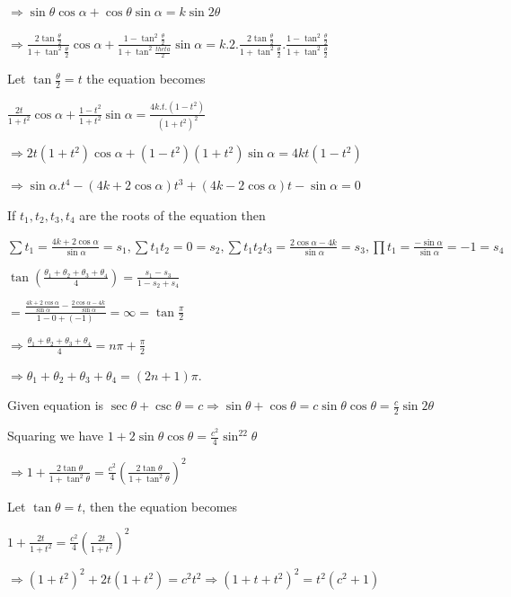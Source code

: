   $\Rightarrow \sin\theta\cos\alpha + \cos\theta\sin\alpha = k\sin2\theta$

  $\Rightarrow \frac{2\tan\frac{\theta}{2}}{1 + \tan^2\frac{\theta}{2}}\cos\alpha + \frac{1
  - \tan^2\frac{\theta}{2}}{1 + \tan^2\frac{theta}{2}}\sin\alpha = k.2.\frac{2\tan\frac{\theta}{2}}{1
  + \tan^2\frac{\theta}{2}}.\frac{1 - \tan^2\frac{\theta}{2}}{1 + \tan^2\frac{\theta}{2}}$

  Let $\tan\frac{\theta}{2} = t$ the equation becomes

  $\frac{2t}{1 + t^2}\cos\alpha + \frac{1 - t^2}{1 + t^2}\sin\alpha = \frac{4k.t.(1 - t^2)}{\left(1 +
    t^2\right)^2}$

  $\Rightarrow 2t\left(1 + t^2\right)\cos\alpha + \left(1 - t^2\right)\left(1 + t^2\right)\sin\alpha =
  4kt\left(1 - t^2\right)$

  $\Rightarrow \sin\alpha.t^4 - (4k + 2\cos\alpha)t^3 + (4k - 2\cos\alpha)t - \sin\alpha = 0$

  If $t_1, t_2, t_3, t_4$ are the roots of the equation then

  $\sum t_1 = \frac{4k + 2\cos\alpha}{\sin\alpha} = s_1, \sum t_1t_2 = 0 = s_2, \sum t_1t_2t_3 = \frac{2\cos\alpha
    - 4k}{\sin\alpha} = s_3, \prod t_1 = \frac{-\sin\alpha}{\sin\alpha} = -1 = s_4$

  $\tan\left(\frac{\theta_1 + \theta_2 + \theta_3 + \theta_4}{4}\right) = \frac{s_1 - s_3}{1 - s_2 + s_4}$

  $= \frac{\frac{4k + 2\cos\alpha}{\sin\alpha} - \frac{2\cos\alpha - 4k}{\sin\alpha}}{1 - 0 + (-1)} = \infty
  = \tan\frac{\pi}{2}$

  $\Rightarrow \frac{\theta_1 + \theta_2 + \theta_3 + \theta_4}{4} = n\pi + \frac{\pi}{2}$

  $\Rightarrow \theta_1 + \theta_2 + \theta_3 + \theta_4 = (2n + 1)\pi$.
\item Given equation is $\sec\theta + \csc\theta = c \Rightarrow \sin\theta + \cos\theta =
  c\sin\theta\cos\theta = \frac{c}{2}\sin2\theta$

  Squaring we have $1 + 2\sin\theta\cos\theta = \frac{c^2}{4}\sin^22\theta$

  $\Rightarrow 1 + \frac{2\tan\theta}{1 + \tan^2\theta} = \frac{c^2}{4}\left(\frac{2\tan\theta}{1
    + \tan^2\theta}\right)^2$

  Let $\tan\theta = t$, then the equation becomes

  $1 + \frac{2t}{1 + t^2} = \frac{c^2}{4}\left(\frac{2t}{1 + t^2}\right)^2$

  $\Rightarrow \left(1 + t^2\right)^2 + 2t(1 + t^2) = c^2t^2 \Rightarrow \left(1 + t + t^2\right)^2 =
  t^2(c^2 + 1)$

